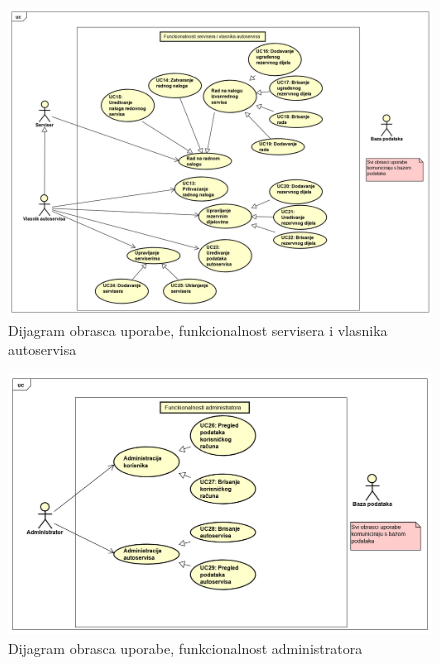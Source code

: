 					\begin{figure}[H]
						\includegraphics[width=\linewidth]{dijagrami/diagram1.png}
						\centering
						\caption{Dijagram obrasca uporabe, funkcionalnost servisera i vlasnika autoservisa}
						\label{fig:diagram1}
					\end{figure}
				
					\begin{figure}[H]
						\includegraphics[width=\linewidth]{dijagrami/diagram2.png}
						\centering
						\caption{Dijagram obrasca uporabe, funkcionalnost administratora}
						\label{fig:diagram2}
					\end{figure}
				
					
				\eject		
				
